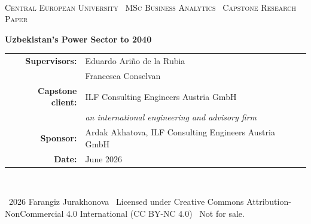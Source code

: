 \documentclass[10pt,twocolumn]{article}
\begin{document}
\pagestyle{empty}\onecolumn
\vspace*{0.5in}
\noindent{\color{navy}\rule{\textwidth}{2.4pt}}\\[3pt]
\noindent{\color{skydeep}\rule{\textwidth}{0.6pt}}\par
\vspace{0.5in}
\begin{center}
{\footnotesize\color{metagrey}\textsc{Central European University \textperiodcentered\ MSc Business Analytics \textperiodcentered\ Capstone Research Paper}\par}
\vspace{18pt}
{\color{navy}\Huge\bfseries Uzbekistan's Power Sector to 2040\par}
\vspace{12pt}{\color{skydeep}\rule{2.3in}{1.4pt}}\par
{}
\vspace{0.45in}
\begin{tabular}{r@{\quad}l}
{\color{navy}\bfseries Supervisors:} & Eduardo Ari\~{n}o de la Rubia\\[1pt]
 & Francesca Conselvan\\[3pt]
{\color{navy}\bfseries Capstone client:} & ILF Consulting Engineers Austria GmbH\\[1pt] & {\footnotesize\itshape\color{metagrey}an international engineering and advisory firm}\\[3pt]
{\color{navy}\bfseries Sponsor:} & Ardak Akhatova, ILF Consulting Engineers Austria GmbH\\[3pt]
{\color{navy}\bfseries Date:} & June 2026\\
\end{tabular}\par
\end{center}
\vfill
\noindent{\color{skydeep}\rule{\textwidth}{0.6pt}}\\[3pt]
\noindent{\color{navy}\rule{\textwidth}{2.4pt}}
\vspace{6pt}
\begin{center}{\footnotesize\color{metagrey}\textcopyright\ 2026 Farangiz Jurakhonova \textperiodcentered\ Licensed under Creative Commons Attribution-NonCommercial 4.0 International (CC BY-NC 4.0) \textperiodcentered\ Not for sale.}\end{center}
\end{document}
